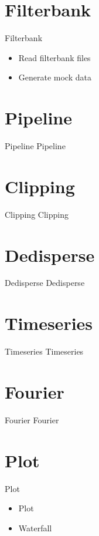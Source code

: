 \documentclass{beamer}
\begin{document}
\section{Filterbank}
\begin{frame}{Filterbank}
	\begin{itemize}
		\item Read filterbank files
		\item Generate mock data
	\end{itemize}
\end{frame}

\section{Pipeline}
\begin{frame}{Pipeline}
	Pipeline
\end{frame}

\section{Clipping}
\begin{frame}{Clipping}
	Clipping
\end{frame}

\section{Dedisperse}
\begin{frame}{Dedisperse}
	Dedisperse
\end{frame}

\section{Timeseries}
\begin{frame}{Timeseries}
	Timeseries
\end{frame}

\section{Fourier}
\begin{frame}{Fourier}
	Fourier
\end{frame}

\section{Plot}
\begin{frame}{Plot}
	\begin{itemize}
		\item Plot
		\item Waterfall
	\end{itemize}
\end{frame}
\end{document}
